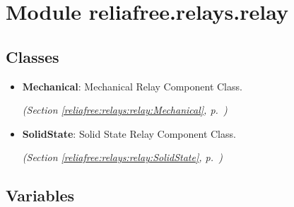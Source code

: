 %
%
%


\section{Module reliafree.relays.relay}

    \label{reliafree:relays:relay}


\subsection{Classes}

\begin{itemize}  \setlength{\parskip}{0ex}
  \item \textbf{Mechanical}: Mechanical Relay Component Class.



  \textit{(Section \ref{reliafree:relays:relay:Mechanical}, p.~\pageref{reliafree:relays:relay:Mechanical})}

  \item \textbf{SolidState}: Solid State Relay Component Class.



  \textit{(Section \ref{reliafree:relays:relay:SolidState}, p.~\pageref{reliafree:relays:relay:SolidState})}

\end{itemize}


  \subsection{Variables}

